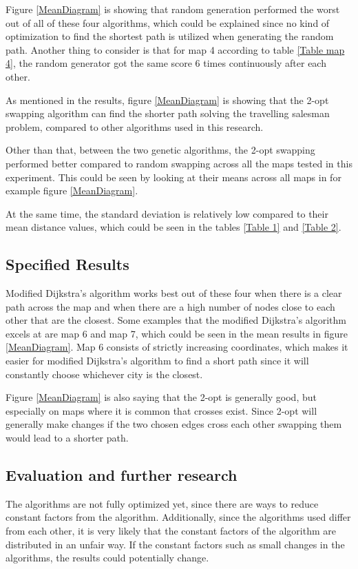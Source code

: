 \documentclass{article}
\begin{document}
\noindent
Figure \ref{MeanDiagram} is showing that random generation performed the worst out of all of these four algorithms, which could be explained since no kind of optimization to find the shortest path is utilized when generating the random path. Another thing to consider is that for map 4 according to table \ref{Table map 4}, the random generator got the same score 6 times continuously after each other. 

\noindent
As mentioned in the results, figure \ref{MeanDiagram} is showing that the 2-opt swapping algorithm can find the shorter path solving the travelling salesman problem, compared to other algorithms used in this research.

\noindent
Other than that, between the two genetic algorithms, the 2-opt swapping performed better compared to random swapping across all the maps tested in this experiment. This could be seen by looking at their means across all maps in for example figure \ref{MeanDiagram}. 

\noindent
At the same time, the standard deviation is relatively low compared to their mean distance values, which could be seen in the tables \ref{Table 1} and \ref{Table 2}. 



\subsection{Specified Results}\label{subsec2}
Modified Dijkstra's algorithm works best out of these four when there is a clear path across the map and when there are a high number of nodes close to each other that are the closest. Some examples that the modified Dijkstra's algorithm excels at are map 6 and map 7, which could be seen in the mean results in figure \ref{MeanDiagram}. Map 6 consists of strictly increasing coordinates, which makes it easier for modified Dijkstra's algorithm to find a short path since it will constantly choose whichever city is the closest. 

\noindent
Figure \ref{MeanDiagram} is also saying that the 2-opt is generally good, but especially on maps where it is common that crosses exist. Since 2-opt will generally make changes if the two chosen edges cross each other swapping them would lead to a shorter path.


\subsection{Evaluation and further research}\label{subsec3}
The algorithms are not fully optimized yet, since there are ways to reduce constant factors from the algorithm. Additionally, since the algorithms used differ from each other, it is very likely that the constant factors of the algorithm are distributed in an unfair way. If the constant factors such as small changes in the algorithms, the results could potentially change. 
\end{document}
